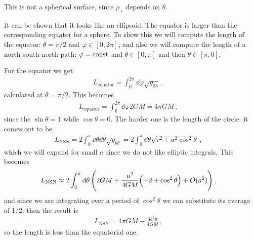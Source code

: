 \documentclass[main.tex]{subfiles}
\begin{document}
This is not a spherical surface, since \(\rho_{+}\) depends on \(\theta \). 

It can be shown that it looks like an ellipsoid. The equator is larger than the corresponding equator for a sphere. To show this we will compute the length of the equator: \(\theta = \pi /2\) and \(\varphi \in [0, 2 \pi ]\), and also we will compute the length of a north-south-north path: \(\varphi = \text{const}\) and \(\theta \in [0, \pi ]\) and then \(\theta \in [\pi , 0]\).

For the equator we get 
%
\begin{align}
  L _{\text{equator}} = \int_{0}^{2 \pi } \dd{\varphi } \sqrt{g_{33}}
\,,
\end{align}
%
calculated at \(\theta = \pi /2\). This becomes 
%
\begin{align}
  L _{\text{equator}} = \int_{0}^{2 \pi } \dd{\varphi } 2GM = 4 \pi GM
\,,
\end{align}
%
since the \(\sin \theta = 1\) while \(\cos \theta = 0\). The harder one is the length of the circle: it comes out to be 
%
\begin{align}
  L _{\text{NSN}} = 2 \int_{0}^{\pi } \dd{\theta } \dd{\theta } \sqrt{g_{\theta \theta }}
  = 2 \int_{0}^{\pi } \dd{\theta } \sqrt{r^2 + a^2 \cos^2\theta }
\,,
\end{align}
%
which we will expand for small \(a\) since we do not like elliptic integrals. This becomes 
%
\begin{align}
  L _{\text{NSN}} \approx 2 \int_{0}^{\pi } \dd{\theta } \qty(2GM + \frac{a^2}{4GM} \qty(-2 + \cos^2 \theta )  + O(a^2))
\,,
\end{align}
%
and since we are integrating over a period of \(\cos^2\theta\) we can substitute its average of \(1/2\): then the result is 
%
\begin{align}
L _{\text{NSN}}  = 4\pi GM - \frac{3a^2 \pi }{4GM}
\,,
\end{align}
%
so the length is less than the equatorial one. 
\end{document}
